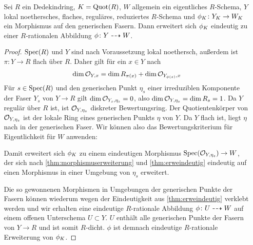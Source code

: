\documentclass[german]{scrreprt}
\begin{document}
\begin{Lemma}\label{thm:erwrrational}
  Sei $R$ ein Dedekindring, $K=\operatorname{Quot}(R)$, $W$ allgemein ein
  eigentliches $R$-Schema, $Y$ lokal noethersches, flaches, reguläres,
  reduziertes 
  $R$-Schema und $\phi_{K}\colon Y_{K}\to W_{K}$ ein Morphismus auf den
  generischen Fasern.
  Dann erweitert sich $\phi_{K}$ eindeutig zu einer
  $R$-rationalen Abbildung $\phi\colon Y\dashrightarrow W$.
  \begin{proof}
    $\operatorname{Spec}(R)$ und $Y$ sind nach Voraussetzung lokal noethersch,
    außerdem ist $\pi\colon Y\to R$ flach über $R$. Daher 
    gilt für ein $x\in Y$ nach \cite[Theorem 4.3.12]{liu}
    \begin{gather}\label{eq:stalkdimension}
      \dim\mathcal{O}_{Y,x} = \dim R_{\pi(x)} + \dim\mathcal{O}_{Y_{\phi(x)}, x}
    \end{gather}
    Für $s\in\operatorname{Spec}(R)$ und den generischen Punkt $\eta_{s}$ einer
    irreduziblen Komponente der Faser $Y_s$ von $Y\to R$ gilt
    $\dim\mathcal{O}_{Y_s, \eta_{s}}=0$, also $\dim\mathcal{O}_{Y,\eta_{s}}=\dim R_s=1$.
    Da $Y$ regulär über $R$ ist, ist $\mathcal{O}_{Y,\eta_{s}}$ diskreter
    Bewertungsring.
    Der Quotientenkörper von $\mathcal{O}_{Y,\eta_{s}}$ ist der lokale Ring
    eines generischen Punkts $\eta$ von $Y$. Da $Y$ flach
    ist, liegt $\eta$ nach \cite[Proposition III.9.7]{hartshorne} in
    der generischen Faser.
    Wir können also das Bewertungskriterium für Eigentlichkeit für $W$
    anwenden:
    \begin{center}
    \end{center}
    Damit erweitert sich $\phi_{K}$ zu einem eindeutigen Morphismus
    $\operatorname{Spec}(\mathcal{O}_{Y,\eta_{s}})\to W$, der sich nach
    \ref{thm:morphismuserweiterung} und \ref{thm:erweindeutig}
    eindeutig auf einen Morphismus in einer Umgebung von $\eta_{s}$
    erweitert.
    
    Die so gewonnenen Morphismen in Umgebungen der generischen Punkte
    der Fasern können wiederum wegen der Eindeutigkeit aus
    \ref{thm:erweindeutig} verklebt werden
    und wir erhalten eine eindeutige $R$-rationale Abbildung
    $\phi\colon U\dashrightarrow W$ auf einem offenen Unterschema $U\subset Y$.
    $U$ enthält alle generischen Punkte der Fasern von $Y\to R$ und
    ist somit $R$-dicht.
    $\phi$ ist demnach eindeutige $R$-rationale Erweiterung von
    $\phi_{K}$.
  \end{proof}
 \end{Lemma}
\end{document}
